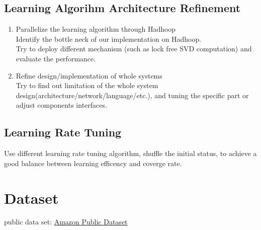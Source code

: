 \documentclass[11pt]{article}
\begin{document}
\subsection{Learning Algorihm Architecture Refinement}
\begin{enumerate}
\item Parallelize the learning algorithm through Hadhoop\\
Identify the bottle neck of our implementation on Hadhoop.\\
Try to deploy different mechanism (such as lock free SVD computation) and evaluate the performance.
\item Refine design/implementation of whole systems\\
Try to find out limitation of the whole system design(architecture/network/language/etc.),
and tuning the specific part or adjust components interfaces.
\end{enumerate}

\subsection{Learning Rate Tuning}
Use different learning rate tuning algorithm, shuffle the initial status,
to achieve a good balance between learning efficency and coverge rate.


\section{Dataset}
public data set:
\href{http://aws.amazon.com/datasets/}{Amazon Public Dataset}
\end{document}
